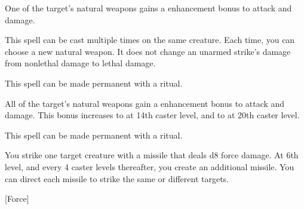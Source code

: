 \begin{spellheader}
    \spellrng{\rngclose}
    \spelldur{\durshort}
\end{spellheader}
\begin{spelleffects}
    \spelleffect One of the target's natural weapons gains a  enhancement bonus to attack and damage. \spellbonusscalingdescription
\end{spelleffects}
\begin{spellfooter}
    \spellnotes This spell can be cast multiple times on the same creature. Each time, you can choose a new natural weapon. It does not change an unarmed strike's damage from nonlethal damage to lethal damage.

    This spell can be made permanent with a  ritual.
\end{spellfooter}

\begin{spellheader}
    \spellrng{\rngclose}
    \spelldur{\durshort}
\end{spellheader}
\begin{spelleffects}
    \spelleffect All of the target's natural weapons gain a  enhancement bonus to attack and damage. This bonus increases to  at 14th caster level, and to  at 20th caster level.
\end{spelleffects}
\begin{spellfooter}
    \spellnotes This spell can be made permanent with a  ritual.
\end{spellfooter}

\begin{spellheader}
\end{spellheader}
\begin{spelleffects}
    \spelleffect You strike one target creature with a missile that deals d8 force damage. At 6th level, and every 4 caster levels thereafter, you create an additional missile. You can direct each missile to strike the same or different targets.
\end{spelleffects}
\begin{spellfooter}
    [Force] \forcespellnotes
\end{spellfooter}

